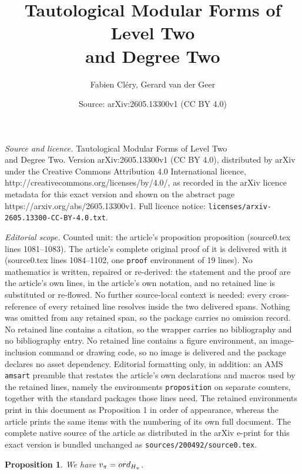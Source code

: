 \documentclass[10pt,a4paper]{amsart}
\title{Tautological Modular Forms of Level Two\\ and Degree Two}
\author{Fabien Cl\'ery, Gerard van der Geer}
\date{Source: arXiv:2605.13300v1 (CC BY 4.0)}
\newtheorem{proposition}{Proposition}
\begin{document}
\maketitle

\noindent\emph{Source and licence.} Tautological Modular Forms of Level Two\\ and Degree Two. Version arXiv:2605.13300v1 (CC BY 4.0), distributed by arXiv under the Creative Commons Attribution 4.0 International licence, http://creativecommons.org/licenses/by/4.0/, as recorded in the arXiv licence metadata for this exact version and shown on the abstract page https://arxiv.org/abs/2605.13300v1. Full licence notice: \texttt{licenses/arxiv-2605.13300-CC-BY-4.0.txt}.\par\smallskip

\noindent\textit{Editorial scope.} Counted unit: the article's proposition proposition (source0.tex lines 1081--1083). The article's complete original proof of it is delivered with it (source0.tex lines 1084--1102, one \texttt{proof} environment of 19 lines). No mathematics is written, repaired or re-derived: the statement and the proof are the article's own lines, in the article's own notation, and no retained line is substituted or re-flowed.  No further source-local context is needed: every cross-reference of every retained line resolves inside the two delivered spans.  Nothing was omitted from any retained span, so the package carries no omission record.  No retained line contains a citation, so the wrapper carries no bibliography and no bibliography entry.  No retained line contains a figure environment, an image-inclusion command or drawing code, so no image is delivered and the package declares no asset dependency.  Editorial formatting only, in addition: an AMS \texttt{amsart} preamble that restates the article's own declarations and macros used by the retained lines, namely the environments \texttt{proposition} on separate counters, together with the standard packages those lines need.  The retained environments print in this document as Proposition 1 in order of appearance, whereas the article prints the same items with the numbering of its own full document.  The complete native source of the article as distributed in the arXiv e-print for this exact version is bundled unchanged as \texttt{sources/200492/source0.tex}.
\begin{proposition}
We have $v_{\pi}={\rm ord}_{H_{\pi}}$.
\end{proposition}
\end{document}
